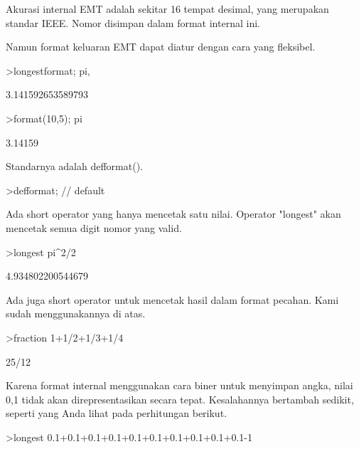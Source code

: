 \documentclass{article}
\begin{document}
\begin{eulernotebook}
\begin{eulercomment}
Akurasi internal EMT adalah sekitar 16 tempat desimal, yang merupakan
standar IEEE. Nomor disimpan dalam format internal ini.

Namun format keluaran EMT dapat diatur dengan cara yang fleksibel.
\end{eulercomment}
\begin{eulerprompt}
>longestformat; pi,
\end{eulerprompt}
\begin{euleroutput}
  3.141592653589793
\end{euleroutput}
\begin{eulerprompt}
>format(10,5); pi
\end{eulerprompt}
\begin{euleroutput}
    3.14159 
\end{euleroutput}
\begin{eulercomment}
Standarnya adalah defformat().
\end{eulercomment}
\begin{eulerprompt}
>defformat; // default
\end{eulerprompt}
\begin{eulercomment}
Ada short operator yang hanya mencetak satu nilai. Operator "longest"
akan mencetak semua digit nomor yang valid.
\end{eulercomment}
\begin{eulerprompt}
>longest pi^2/2
\end{eulerprompt}
\begin{euleroutput}
        4.934802200544679 
\end{euleroutput}
\begin{eulercomment}
Ada juga short operator untuk mencetak hasil dalam format pecahan.
Kami sudah menggunakannya di atas.
\end{eulercomment}
\begin{eulerprompt}
>fraction 1+1/2+1/3+1/4
\end{eulerprompt}
\begin{euleroutput}
  25/12
\end{euleroutput}
\begin{eulercomment}
Karena format internal menggunakan cara biner untuk menyimpan angka,
nilai 0,1 tidak akan direpresentasikan secara tepat. Kesalahannya
bertambah sedikit, seperti yang Anda lihat pada perhitungan berikut.
\end{eulercomment}
\begin{eulerprompt}
>longest 0.1+0.1+0.1+0.1+0.1+0.1+0.1+0.1+0.1+0.1-1
\end{eulerprompt}

\end{eulernotebook}
\end{document}
